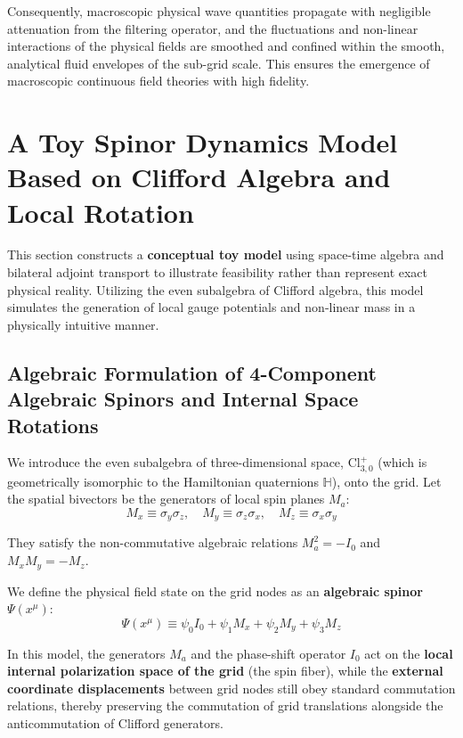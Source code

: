 \documentclass[12pt, a4paper]{article}
\begin{document}
Consequently, macroscopic physical wave quantities propagate with negligible attenuation from the filtering operator, and the fluctuations and non-linear interactions of the physical fields are smoothed and confined within the smooth, analytical fluid envelopes of the sub-grid scale. This ensures the emergence of macroscopic continuous field theories with high fidelity.

\section{A Toy Spinor Dynamics Model Based on Clifford Algebra and Local Rotation}

This section constructs a \textbf{conceptual toy model} using space-time algebra and bilateral adjoint transport to illustrate feasibility rather than represent exact physical reality. Utilizing the even subalgebra of Clifford algebra, this model simulates the generation of local gauge potentials and non-linear mass in a physically intuitive manner.

\subsection{Algebraic Formulation of 4-Component Algebraic Spinors and Internal Space Rotations}

We introduce the even subalgebra of three-dimensional space, $\text{Cl}_{3,0}^+$ (which is geometrically isomorphic to the Hamiltonian quaternions $\mathbb{H}$), onto the grid. Let the spatial bivectors be the generators of local spin planes $M_a$:
\begin{equation}
\label{eq:bivectors}
M_x \equiv \sigma_y \sigma_z, \quad M_y \equiv \sigma_z \sigma_x, \quad M_z \equiv \sigma_x \sigma_y
\end{equation}

They satisfy the non-commutative algebraic relations $M_a^2 = -I_0$ and $M_x M_y = -M_z$.

We define the physical field state on the grid nodes as an \textbf{algebraic spinor $\Psi(x^\mu)$}:
\begin{equation}
\label{eq:spinor_def}
\Psi(x^\mu) \equiv \psi_0 I_0 + \psi_1 M_x + \psi_2 M_y + \psi_3 M_z
\end{equation}

In this model, the generators $M_a$ and the phase-shift operator $I_0$ act on the \textbf{local internal polarization space of the grid} (the spin fiber), while the \textbf{external coordinate displacements} between grid nodes still obey standard commutation relations, thereby preserving the commutation of grid translations alongside the anticommutation of Clifford generators.
\end{document}
